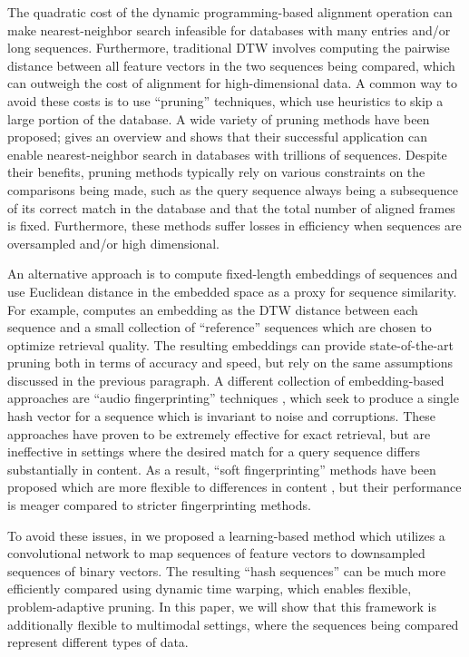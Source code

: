 \documentclass{article} %
\begin{document}
The quadratic cost of the dynamic programming-based alignment operation can make nearest-neighbor search infeasible for databases with many entries and/or long sequences.
Furthermore, traditional DTW involves computing the pairwise distance between all feature vectors in the two sequences being compared, which can outweigh the cost of alignment for high-dimensional data.
A common way to avoid these costs is to use ``pruning'' techniques, which use heuristics to skip a large portion of the database.
A wide variety of pruning methods have been proposed; \cite{rakthanmanon2012searching} gives an overview and shows that their successful application can enable nearest-neighbor search in databases with trillions of sequences.
Despite their benefits, pruning methods typically rely on various constraints on the comparisons being made, such as the query sequence always being a subsequence of its correct match in the database and that the total number of aligned frames is fixed.
Furthermore, these methods suffer losses in efficiency when sequences are oversampled and/or high dimensional.

An alternative approach is to compute fixed-length embeddings of sequences and use Euclidean distance in the embedded space as a proxy for sequence similarity.
For example, \cite{papapetrou2011embedding} computes an embedding as the DTW distance between each sequence and a small collection of ``reference'' sequences which are chosen to optimize retrieval quality.
The resulting embeddings can provide state-of-the-art pruning both in terms of accuracy and speed, but rely on the same assumptions discussed in the previous paragraph.
A different collection of embedding-based approaches are ``audio fingerprinting'' techniques \cite{wang2003industrial}, which seek to produce a single hash vector for a sequence which is invariant to noise and corruptions.
These approaches have proven to be extremely effective for exact retrieval, but are ineffective in settings where the desired match for a query sequence differs substantially in content.
As a result, ``soft fingerprinting'' methods have been proposed which are more flexible to differences in content \cite{van2015audio}, but their performance is meager compared to stricter fingerprinting methods.

To avoid these issues, in \cite{raffel2015large} we proposed a learning-based method which utilizes a convolutional network to map sequences of feature vectors to downsampled sequences of binary vectors.
The resulting ``hash sequences'' can be much more efficiently compared using dynamic time warping, which enables flexible, problem-adaptive pruning.
In this paper, we will show that this framework is additionally flexible to multimodal settings, where the sequences being compared represent different types of data.
\end{document}
